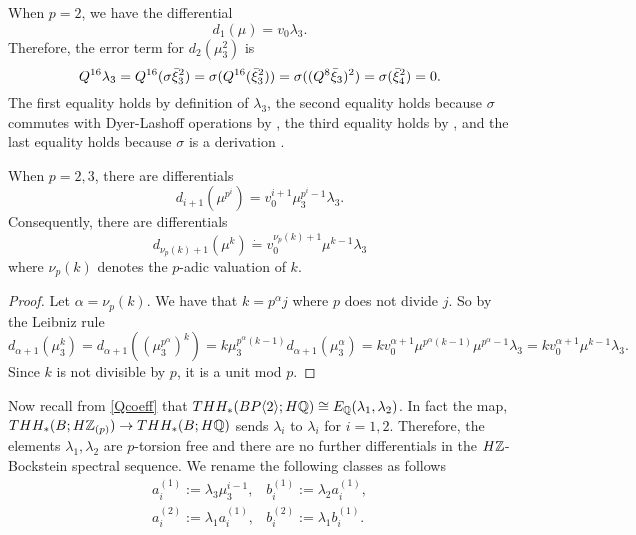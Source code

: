 When $p=2$, we have the differential 
\[
d_1(\mu)=v_0\lambda_3.
\]
Therefore, the error term for $d_2(\mu_3^2)$ is 
\[
Q^{16}\lambda_3 = Q^{16}(\sigma\bar{\xi}_3^2) = \sigma(Q^{16}(\bar{\xi}_3^2)) = \sigma((Q^8\bar{\xi}_3)^2) = \sigma(\bar{\xi}_4^2)=0.
\]
The first equality holds by definition of $\lambda_3$, the second equality holds because $\sigma$ commutes with Dyer-Lashoff operations by \cite{Bok85}, the third equality holds by \cite{BMMS86}, and the last equality holds because $\sigma$ is a derivation \cite{AngeltveitRognes}.
\begin{cor}
	When $p=2,3$, there are differentials
	\[
	d_{i+1}(\mu^{p^i}) = v_0^{i+1}\mu_3^{p^i-1}\lambda_3.
	\]
	Consequently, there are differentials
	\[
	d_{\nu_p(k)+1}(\mu^k) \dot{=}v_0^{\nu_p(k)+1}\mu^{k-1}\lambda_3
	\]
	where $\nu_p(k)$ denotes the $p$-adic valuation of $k$.
\end{cor}
\begin{proof}
	Let $\alpha=\nu_p(k)$. We have that $k=p^\alpha j$ where $p$ does not divide $j$. So by the Leibniz rule
	\[
	d_{\alpha+1}(\mu_3^{k}) = d_{\alpha+1}((\mu_3^{p^\alpha})^k) = k\mu_3^{p^{\alpha}(k-1)}d_{\alpha+1}(\mu_3^{\alpha}) = kv_0^{\alpha+1}\mu^{p^\alpha (k-1)}\mu^{p^{\alpha}-1}\lambda_3 = kv_0^{\alpha+1}\mu^{k-1}\lambda_3.
	\]
	Since $k$ is not divisible by $p$, it is a unit mod $p$.
\end{proof}
Now recall from \eqref{Qcoeff} that $THH_*(BP\langle 2 \rangle;H\mathbb{Q})\cong E_{\mathbb{Q}}(\lambda_1,\lambda_2)$. In fact the map, $THH_*(B;H\mathbb{Z}_{(p)})\to THH_*(B;H\mathbb{Q})$ sends $\lambda_i$ to $\lambda_i$ for $i=1,2$.
Therefore, the elements $\lambda_1,\lambda_2$ are $p$-torsion free and there are no further differentials in the $H\mathbb{Z}$-Bockstein spectral sequence.  We rename the following classes as follows 
\begin{equation}\label{HZgens}
	\begin{array}{cc} 
		a^{(1)}_i:=\lambda_3\mu_3^{i-1},  & b_i^{(1)}:=\lambda_2a_i^{(1)}, \\
		a_i^{(2)}:=\lambda_1a_i^{(1)}, & b_i^{(2)}:=\lambda_1b^{(1)}_i.
	\end{array}
\end{equation}


